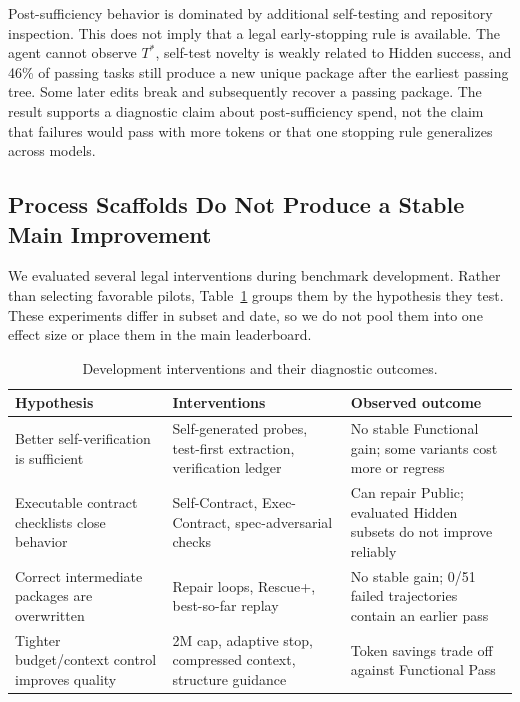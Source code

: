 \documentclass[acmsmall,anonymous,review,screen]{acmart}
\begin{document}
Post-sufficiency behavior is dominated by additional self-testing and
repository inspection. This does not imply that a legal early-stopping rule is
available. The agent cannot observe $T^*$, self-test novelty is weakly related
to Hidden success, and 46\% of passing tasks still produce a new unique package
after the earliest passing tree. Some later edits break and subsequently
recover a passing package. The result supports a diagnostic claim about
post-sufficiency spend, not the claim that failures would pass with more tokens
or that one stopping rule generalizes across models.

\subsection{Process Scaffolds Do Not Produce a Stable Main Improvement}

We evaluated several legal interventions during benchmark development. Rather
than selecting favorable pilots, Table~\ref{tab:negative} groups them by the
hypothesis they test. These experiments differ in subset and date, so we do not
pool them into one effect size or place them in the main leaderboard.

\begin{table}[t]
  \caption{Development interventions and their diagnostic outcomes.}
  \label{tab:negative}
  \centering
  \begin{tabularx}{\textwidth}{@{}p{}p{}X@{}}
    \toprule
    \textbf{Hypothesis} & \textbf{Interventions} & \textbf{Observed outcome} \\
    \midrule
    Better self-verification is sufficient
      & Self-generated probes, test-first extraction, verification ledger
      & No stable Functional gain; some variants cost more or regress \\
    Executable contract checklists close behavior
      & Self-Contract, Exec-Contract, spec-adversarial checks
      & Can repair Public; evaluated Hidden subsets do not improve reliably \\
    Correct intermediate packages are overwritten
      & Repair loops, Rescue+, best-so-far replay
      & No stable gain; 0/51 failed trajectories contain an earlier pass \\
    Tighter budget/context control improves quality
      & 2M cap, adaptive stop, compressed context, structure guidance
      & Token savings trade off against Functional Pass \\
    \bottomrule
  \end{tabularx}
\end{table}
\end{document}
